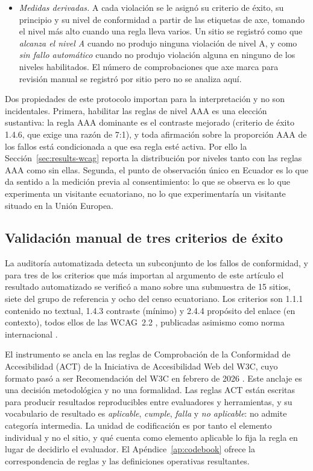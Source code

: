 \documentclass[pdflatex,sn-basic,Numbered,iicol]{sn-jnl}
\theoremstyle{thmstyleone}
\theoremstyle{thmstyletwo}
\theoremstyle{thmstylethree}
\begin{document}
\begin{itemize}
	\item \emph{Medidas derivadas.} A cada violaci\'on se le asign\'o su criterio de \'exito, su principio y su nivel de conformidad a partir de las etiquetas de axe, tomando el nivel m\'as alto cuando una regla lleva varios. Un sitio se registr\'o como que \emph{alcanza el nivel A} cuando no produjo ninguna violaci\'on de nivel A, y como \emph{sin fallo autom\'atico} cuando no produjo violaci\'on alguna en ninguno de los niveles habilitados. El n\'umero de comprobaciones que axe marca para revisi\'on manual se registr\'o por sitio pero no se analiza aqu\'i.
\end{itemize}

Dos propiedades de este protocolo importan para la interpretaci\'on y no son incidentales. Primera, habilitar las reglas de nivel AAA es una elecci\'on sustantiva: la regla AAA dominante es el contraste mejorado (criterio de \'exito 1.4.6, que exige una raz\'on de 7:1), y toda afirmaci\'on sobre la proporci\'on AAA de los fallos est\'a condicionada a que esa regla est\'e activa. Por ello la Secci\'on~\ref{sec:results-wcag} reporta la distribuci\'on por niveles tanto con las reglas AAA como sin ellas. Segunda, el punto de observaci\'on \'unico en Ecuador es lo que da sentido a la medici\'on previa al consentimiento: lo que se observa es lo que experimenta un visitante ecuatoriano, no lo que experimentar\'ia un visitante situado en la Uni\'on Europea.

\subsection{Validaci\'on manual de tres criterios de \'exito}\label{sec:methods-manual}

La auditor\'ia automatizada detecta un subconjunto de los fallos de conformidad, y para tres de los criterios que m\'as importan al argumento de este art\'iculo el resultado automatizado se verific\'o a mano sobre una submuestra de 15 sitios, siete del grupo de referencia y ocho del censo ecuatoriano. Los criterios son 1.1.1 contenido no textual, 1.4.3 contraste (m\'inimo) y 2.4.4 prop\'osito del enlace (en contexto), todos ellos de las WCAG~2.2 \citep{wcag22}, publicadas asimismo como norma internacional \citep{iso40500}.

El instrumento se ancla en las reglas de Comprobaci\'on de la Conformidad de Accesibilidad (ACT) de la Iniciativa de Accesibilidad Web del W3C, cuyo formato pas\'o a ser Recomendaci\'on del W3C en febrero de 2026 \citep{actformat}. Este anclaje es una decisi\'on metodol\'ogica y no una formalidad. Las reglas ACT est\'an escritas para producir resultados reproducibles entre evaluadores y herramientas, y su vocabulario de resultado es \emph{aplicable}, \emph{cumple}, \emph{falla} y \emph{no aplicable}: no admite categor\'ia intermedia. La unidad de codificaci\'on es por tanto el elemento individual y no el sitio, y qu\'e cuenta como elemento aplicable lo fija la regla en lugar de decidirlo el evaluador. El Ap\'endice~\ref{ap:codebook} ofrece la correspondencia de reglas \citep{actrules} y las definiciones operativas resultantes.
\end{document}
